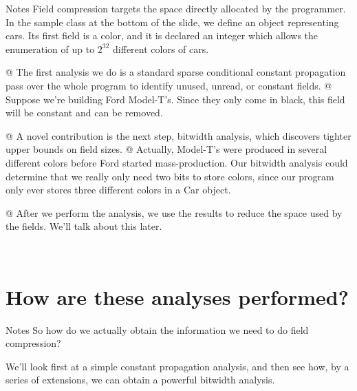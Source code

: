 \documentclass[%
pdf,
colorBG,
slideColor,
nototal,
oqe
]{prosper}
\newenvironment{talknotes}{\begin{slide}{Notes}\tiny}{\end{slide}}
\begin{document}
\begin{talknotes}
Field compression targets the space directly allocated by the
programmer.  In the sample class at the bottom of the slide, we
define an object representing cars.  Its first field is a color,
and it is declared an integer which allows the enumeration of up
to $2^{32}$ different colors of cars.

@ The first analysis we do is a standard sparse conditional constant
propagation pass over the whole program to identify unused, unread,
or constant fields.  @ Suppose we're building Ford Model-T's.
Since they only come in black, this field will be constant and
can be removed.

@ A novel contribution is the next step, bitwidth analysis, which discovers
tighter upper bounds on field sizes.  @  Actually, Model-T's were
produced in several different colors before Ford started
mass-production.  Our bitwidth analysis could determine that
we really only need two bits to store colors, since our program
only ever stores three different colors in a Car object.

@ After we perform the analysis, we use the results to
reduce the space used by the fields.  We'll talk about this later.

~%
\end{talknotes}

\part{How are these analyses performed?}
\begin{talknotes}
So how do we actually obtain the information we need to do field
compression?

We'll look first at a simple constant propagation analysis, and then
see how, by a series of extensions, we can obtain a
powerful bitwidth analysis.

~%
\end{talknotes}
\end{document}
